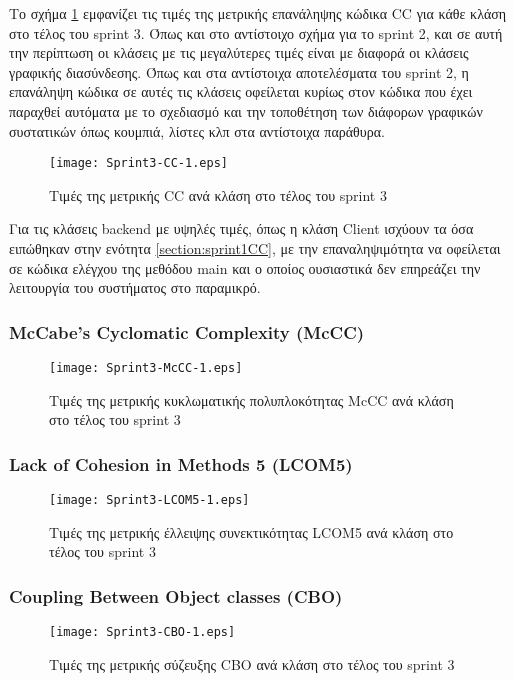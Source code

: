 Το σχήμα \ref{fig:sprint3CC} εμφανίζει τις τιμές της μετρικής επανάληψης
κώδικα CC για κάθε κλάση στο τέλος του sprint 3. Όπως και στο αντίστοιχο
σχήμα για το sprint 2, και σε αυτή την περίπτωση οι κλάσεις με τις
μεγαλύτερες τιμές είναι με διαφορά οι κλάσεις γραφικής διασύνδεσης. Όπως
και στα αντίστοιχα αποτελέσματα του sprint 2, η επανάληψη κώδικα σε
αυτές τις κλάσεις οφείλεται κυρίως στον κώδικα που έχει παραχθεί
αυτόματα με το σχεδιασμό και την τοποθέτηση των διάφορων γραφικών
συστατικών όπως κουμπιά, λίστες κλπ στα αντίστοιχα παράθυρα.

\begin{figure}
\centering
\texttt{[image: Sprint3-CC-1.eps]}
\caption{Τιμές της μετρικής CC ανά κλάση στο τέλος του sprint 3}
\label{fig:sprint3CC}
\end{figure}

Για τις κλάσεις backend με υψηλές τιμές, όπως η κλάση Client ισχύουν τα
όσα ειπώθηκαν στην ενότητα \ref{section:sprint1CC}, με την
επαναληψιμότητα να οφείλεται σε κώδικα ελέγχου της μεθόδου main και ο
οποίος ουσιαστικά δεν επηρεάζει την λειτουργία του συστήματος στο
παραμικρό.



\subsubsection{McCabe’s Cyclomatic Complexity (McCC)}
\label{section:sprint3McCC}

\begin{figure}
\centering
\texttt{[image: Sprint3-McCC-1.eps]}
\caption{Τιμές της μετρικής κυκλωματικής πολυπλοκότητας McCC ανά κλάση στο τέλος του sprint 3}
\label{fig:sprint3McCC}
\end{figure}

\subsubsection{Lack of Cohesion in Methods 5 (LCOM5)}
\label{section:sprint3LCOM5}

\begin{figure}
\centering
\texttt{[image: Sprint3-LCOM5-1.eps]}
\caption{Τιμές της μετρικής έλλειψης συνεκτικότητας LCOM5 ανά κλάση στο τέλος του sprint 3}
\label{fig:sprint3LCOM5}
\end{figure}

\subsubsection{Coupling Between Object classes (CBO)}
\label{section:sprint3CBO}

\begin{figure}
\centering
\texttt{[image: Sprint3-CBO-1.eps]}
\caption{Τιμές της μετρικής σύζευξης CBO ανά κλάση στο τέλος του sprint 3}
\label{fig:sprint3CBO}
\end{figure}
